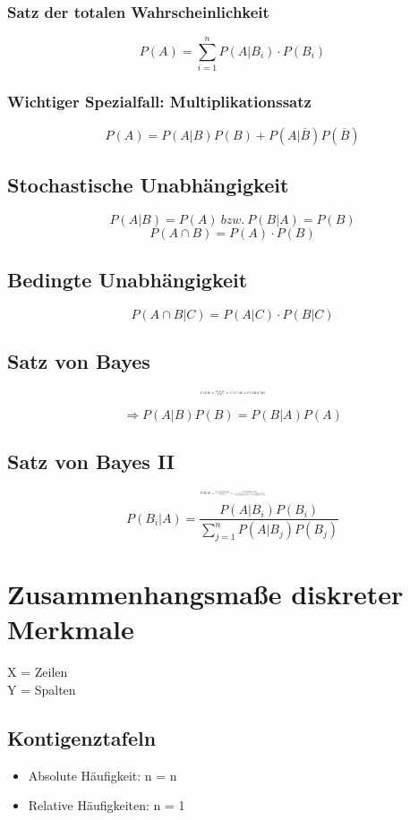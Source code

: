 \documentclass[10pt,a4paper,landscape]{article}
\begin{document}
\begin{multicols}{4}
\subsubsection*{Satz der totalen Wahrscheinlichkeit}
\[
P(A)=\sum_{i=1}^n P(A|B_i) \cdot P(B_i)
\]

\subsubsection*{Wichtiger Spezialfall: Multiplikationssatz}
\[
P(A)=P(A|B)P(B)+P(A|\overline{B})P(\overline{B})
\]

\subsection{Stochastische Unabhängigkeit}
\[
P(A|B) = P(A) ~bzw.~ P(B|A)=P(B)
\]
\[
P(A \cap B)=P(A) \cdot P(B)
\]

\subsection{Bedingte Unabhängigkeit}
\[
P(A \cap B|C)=P(A|C)\cdot P(B|C)
\]

\subsection{Satz von Bayes}
\[ \resizebox{0.15\textwidth}{!}{$
P(A|B)=\frac{P(A\cap B)}{P(B)} \Rightarrow P(A\cap B)=P(A|B)P(B)
$}
\]

\[
\Rightarrow P(A|B)P(B)=P(B|A)P(A)
\]

\subsection{Satz von Bayes II}
\[ \resizebox{0.15\textwidth}{!}{$
P(B|A)=\frac{P(A|B)P(B)}{P(A)}=\frac{P(A|B)P(B)}{P(A|B)P(B)+P(A|\overline{B})P(\overline{B})}
$}
\]
\[ 
P(B_i|A)=\frac{P(A|B_i)P(B_i)}{\sum_{j=1}^n P(A|B_j)P(B_j)}
\]


\section{Zusammenhangsmaße diskreter Merkmale}
X = Zeilen \\
Y = Spalten
\subsection{Kontigenztafeln}
\begin{itemize}
\item Absolute Häufigkeit: n = n
\item Relative Häufigkeiten: n = 1
\end{itemize}


\end{multicols}
\end{document}
